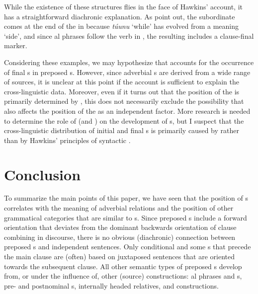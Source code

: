 \documentclass[output=paper]{langsci/langscibook}
\begin{document}
\noindent While the existence of these structures flies in the face of Hawkins’  account, it has a straightforward diachronic explanation. As \citet[340]{PaynePayne1990} point out, the subordinate  comes at the end of the  in  because \textit{túunu} ‘while’ has evolved from a  meaning ‘side’, and since al phrases follow the verb in , the resulting  includes a clause-final marker.\label{p:diessel:exception}

Considering these examples, we may hypothesize that  accounts for the occurrence of final s in preposed s. However, since adverbial s are derived from a wide range of sources, it is unclear at this point if the  account is sufficient to explain the cross-linguistic data. Moreover, even if it turns out that the position of the  is primarily determined by , this does not necessarily exclude the possibility that  also affects the position of the  as an independent factor. More research is needed to determine the role of  (and ) on the development of s, but I suspect that the cross-linguistic distribution of initial and final s is primarily caused by  rather than by Hawkins’ principles of syntactic .

\section{Conclusion}

To summarize the main points of this paper, we have seen that the position of s correlates with the meaning of adverbial relations and the position of other grammatical categories that are similar to s. Since preposed s include a forward orientation that deviates from the dominant backwards orientation of clause combining in discourse, there is no obvious (diachronic) connection between preposed s and independent sentences. Only conditional and some s that precede the main clause are (often) based on juxtaposed sentences that are oriented towards the subsequent clause. All other semantic types of preposed s develop from, or under the influence of, other (source) constructions: al phrases and s, pre- and postnominal s, internally headed relatives, and  constructions.
\end{document}
